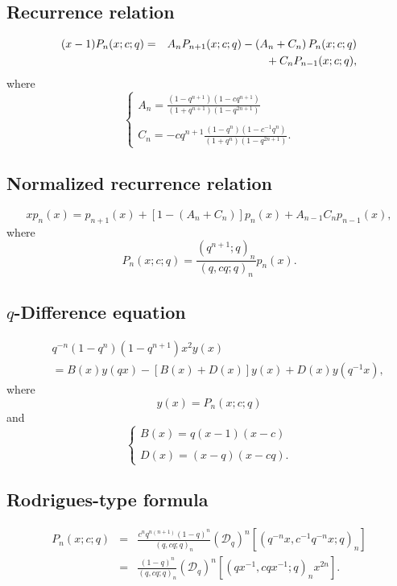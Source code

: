 \documentclass[envcountchap,graybox]{svmono}
\newcommand{\mathindent}{\hspace{7.5mm}}
\begin{document}
\subsection*{Recurrence relation}
\begin{eqnarray}
\label{RecBigqLegendre}
(x-1)P_n(x;c;q)&=&A_nP_{n+1}(x;c;q)-\left(A_n+C_n\right)P_n(x;c;q)\nonumber\\
& &{}\mathindent{}+C_nP_{n-1}(x;c;q),
\end{eqnarray}
where
$$\left\{\begin{array}{l}
\displaystyle A_n=\frac{(1-q^{n+1})(1-cq^{n+1})}{(1+q^{n+1})(1-q^{2n+1})}\\
\\
\displaystyle C_n=-cq^{n+1}\frac{(1-q^n)(1-c^{-1}q^n)}{(1+q^n)(1-q^{2n+1})}.
\end{array}\right.$$

\subsection*{Normalized recurrence relation}
\begin{equation}
\label{NormRecBigqLegendre}
xp_n(x)=p_{n+1}(x)+\left[1-(A_n+C_n)\right]p_n(x)+A_{n-1}C_np_{n-1}(x),
\end{equation}
where
$$P_n(x;c;q)=\frac{(q^{n+1};q)_n}{(q,cq;q)_n}p_n(x).$$

\subsection*{$q$-Difference equation}
\begin{eqnarray}
\label{dvBigqLegendre}
& &q^{-n}(1-q^n)(1-q^{n+1})x^2y(x)\nonumber\\
& &{}=B(x)y(qx)-\left[B(x)+D(x)\right]y(x)+D(x)y(q^{-1}x),
\end{eqnarray}
where
$$y(x)=P_n(x;c;q)$$
and
$$\left\{\begin{array}{l}\displaystyle B(x)=q(x-1)(x-c)\\
\\
\displaystyle D(x)=(x-q)(x-cq).\end{array}\right.$$

\subsection*{Rodrigues-type formula}
\begin{eqnarray}
\label{RodBigqLegendre}
P_n(x;c;q)&=&\frac{c^nq^{n(n+1)}(1-q)^n}{(q,cq;q)_n}
\left(\mathcal{D}_q\right)^n\left[(q^{-n}x,c^{-1}q^{-n}x;q)_n\right]\\
&=&\frac{(1-q)^n}{(q,cq;q)_n}\left(\mathcal{D}_q\right)^n
\left[(qx^{-1},cqx^{-1};q)_nx^{2n}\right].\nonumber
\end{eqnarray}
\end{document}
